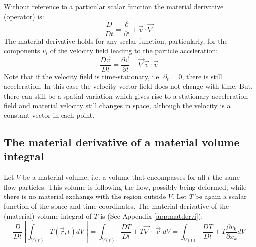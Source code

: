 Without reference to a particular scalar function the material 
derivative (operator) is:
\begin{equation}
\frac{D}{Dt} = \frac{\partial }{\partial t}
+\vec{v} \cdot \vec\nabla 
\label{eq:md07}
\end{equation}
The material derivative holds for any scalar function, 
particularly, for the components $v_i$
of the velocity field leading to the particle acceleration:
\begin{equation}
\frac{D \vec{v}}{Dt} 
= \frac{\partial \vec{v}}{\partial t} + \vec\nabla \vec{v} \cdot \vec{v}
\label{eq:md08}
\end{equation}
Note that if the velocity field is time-stationary, i.e. 
$\partial_t=0$, there is still acceleration. In
this case the velocity vector field does not change with time. 
But, there can still be a
spatial variation which gives rise to a stationary acceleration 
field and material velocity
still changes in space, although the velocity is a constant vector in each point.

\vspace{0.5cm}
\vspace{0.5cm}

\subsection{The material derivative of a material volume integral}
Let $V$ be a material volume, i.e. a
volume that encompasses for all $t$ the same flow particles. 
This volume is following the
flow, possibly being deformed, while there is no material exchange 
with the region outside $V$. Let $T$ be again a scalar function 
of the space and time coordinates. The
material derivative of the (material) volume integral 
of $T$ is (See Appendix \ref{app:matdervi}):
\begin{equation}
\frac{D}{Dt}
\left[
\int_{V(t)} T(\vec{r},t) dV
\right]
=
\int_{V(t)} \frac{DT}{Dt} + T \vec\nabla\cdot \vec\upnu dV
=
\int_{V(t)} \frac{DT}{Dt} + T \frac{\partial v_k}{\partial x_k} dV
\label{eq:md09}
\end{equation}


